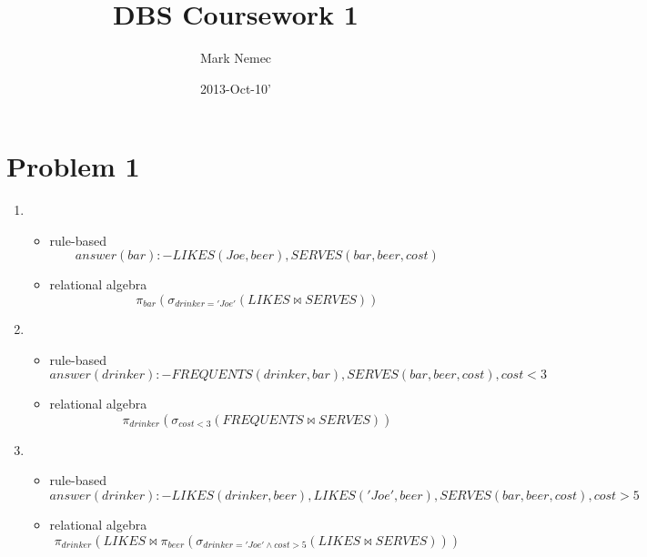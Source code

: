 \documentclass[a4paper]{article}
\title{DBS Coursework 1}
\author{Mark Nemec}
\date{2013-Oct-10'}
\begin{document}
\section*{Problem 1}
\begin{enumerate}
    \item \mbox{}
    \begin{itemize}
        \item rule-based
        \begin{equation*}
        answer(bar) :- LIKES(Joe, beer), SERVES(bar, beer, cost)
        \end{equation*}
        \item relational algebra
        \begin{equation*}
        \pi_{bar}(\sigma_{drinker='Joe'}(LIKES \bowtie SERVES))
        \end{equation*}
    \end{itemize}

    \item \mbox{}
    \begin{itemize}
        \item rule-based
        \begin{equation*}
        answer(drinker) :- FREQUENTS(drinker, bar), SERVES(bar, beer, cost), cost < 3
        \end{equation*}
        \item relational algebra
        \begin{equation*}
        \pi_{drinker}(\sigma_{cost < 3}(FREQUENTS \bowtie SERVES))
        \end{equation*}
    \end{itemize}

    \item \mbox{}
    \begin{itemize}
        \item rule-based
        \begin{equation*}
        answer(drinker) :- LIKES(drinker, beer), LIKES('Joe', beer), SERVES(bar, beer, cost), cost > 5
        \end{equation*}
        \item relational algebra
        \begin{equation*}
        \pi_{drinker}(LIKES \bowtie \pi_{beer}(\sigma_{drinker='Joe' \land cost > 5}(LIKES \bowtie SERVES)))
        \end{equation*}
    \end{itemize}
\end{enumerate}
\end{document}
